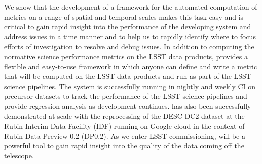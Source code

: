 We show that the development of a framework for the automated computation of metrics on a range of spatial and temporal scales makes this task easy and is critical to gain rapid insight into the performance of the developing system and address issues in a time manner and to help us to rapidly identify where to focus efforts of investigation to resolve and debug issues.
In addition to computing the normative science performance metrics on the LSST data products, \faro provides a flexible and easy-to-use framework in which anyone can define and write a metric that will be computed on the LSST data products and run as part of the LSST science pipelines. 
The system is successfully running in nightly and weekly CI on precursor datasets to track the performance of the LSST science pipelines and provide regression analysis as development continues. 
\faro has also been successfully demonstrated at scale with the reprocessing of the DESC DC2 dataset \cite{2021ApJS..253...31L} at the Rubin Interim Data Facility (IDF) running on Google cloud \cite{2021arXiv211115030O} in the context of Rubin Data Preview 0.2 (DP0.2)\cite{RTN-001}. 
As we enter LSST commissioning, \faro will be a powerful tool to gain rapid insight into the quality of the data coming off the telescope. 
